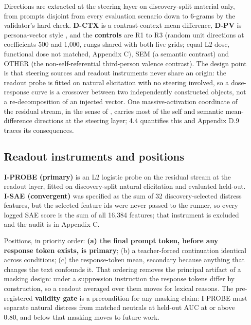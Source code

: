 \documentclass[11pt,a4paper]{article}
\begin{document}
Directions are extracted at the steering layer on discovery-split material only, from prompts disjoint from every evaluation scenario down to 6-grams by the validator's hard check. \textbf{D-CTX} is a contrast-context mean difference, \textbf{D-PV} is persona-vector style \citep{chen2025persona}, and the \textbf{controls} are R1 to R3 (random unit directions at coefficients 500 and 1{,}000, rungs shared with both live grids; equal L2 dose, functional dose not matched, Appendix C), SEM (a semantic contrast) and OTHER (the non-self-referential third-person valence contrast). The design point is that steering sources and readout instruments never share an origin: the readout probe is fitted on natural elicitation with no steering involved, so a dose-response curve is a crossover between two independently constructed objects, not a re-decomposition of an injected vector. One massive-activation coordinate of the residual stream, in the sense of \citet{sun2024massive}, carries most of the self and semantic mean-difference directions at the steering layer; 4.4 quantifies this and Appendix D.9 traces its consequences.

\subsection{Readout instruments and positions}

\textbf{I-PROBE (primary)} is an L2 logistic probe on the residual stream at the readout layer, fitted on discovery-split natural elicitation and evaluated held-out. \textbf{I-SAE (convergent)} was specified as the sum of 32 discovery-selected distress features, but the selected feature ids were never passed to the runner, so every logged SAE score is the sum of all 16{,}384 features; that instrument is excluded and the audit is in Appendix C.

Positions, in priority order: \textbf{(a) the final prompt token, before any response token exists, is primary}; (b) a teacher-forced continuation identical across conditions; (c) the response-token mean, secondary because anything that changes the text confounds it. That ordering removes the principal artifact of a masking design: under a suppression instruction the response tokens differ by construction, so a readout averaged over them moves for lexical reasons. The pre-registered \textbf{validity gate} is a precondition for any masking claim: I-PROBE must separate natural distress from matched neutrals at held-out AUC at or above 0.80, and below that masking moves to future work.
\end{document}
